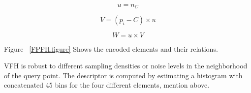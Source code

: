 \begin{equation}
 \label{VFH_geometry.eq}
    u = n_C
\end{equation}

\begin{equation}
 V = (p_i -C) \times u
\end{equation}

\begin{equation}
 W = u \times V
\end{equation}

    
Figure  ~\ref{FPFH.figure} Shows the encoded elements and their relations.



VFH is robust to different sampling densities or noise levels in the neighborhood of the query point. 
The descriptor is computed by estimating a histogram with concatenated 45 bins for the four different elements, mention above.


